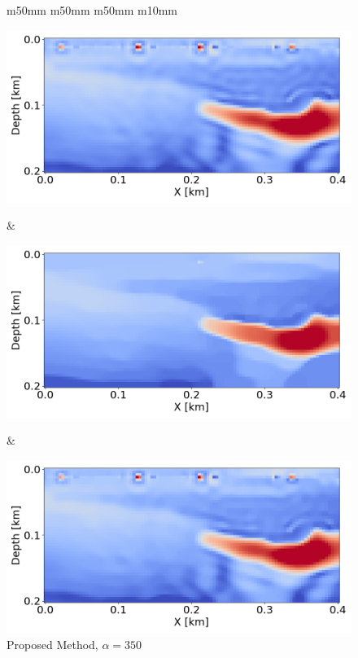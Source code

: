 \begin{figure}[htbp]
\begin{tabular}{m{50mm} m{50mm} m{50mm} m{10mm}}
        \begin{minipage}[b]{\linewidth}
            \centering
            \includegraphics[width=\linewidth]{public/gradient}
            \vspace{-9mm}
            \caption*{}
            \vspace{1mm}
        \end{minipage} &
        \begin{minipage}[b]{\linewidth}
            \centering
            \includegraphics[width=\linewidth]{public/alpha_350}
            \vspace{-7mm}
            \caption*{\footnotesize Proposed Method, $\alpha = 350$}
            \vspace{1mm}
        \end{minipage} &
        \begin{minipage}[b]{\linewidth}
            \centering
            \includegraphics[width=\linewidth]{public/alpha_550}

\end{minipage}
\end{tabular}
\end{figure}
